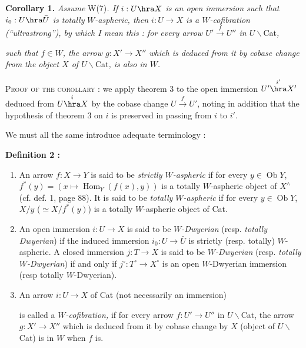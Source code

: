 \textbf{Corollary 1.} \textit{Assume} W(7)\textit{. If $i:U\hra X$ is an open immersion such that $i_0:U\hra\bar{U}$ is totally} \textit{$W$-aspheric, then $i:U\longrightarrow X$ is a $W$-cofibration (``ultrastrong''), by which I mean this : for every arrow $U'\xrightarrow{f}U''$ in $U\backslash$}Cat\textit{,}


\textit{such that $f\in W$, the arrow $g:X'\longrightarrow X''$ which is deduced from it by cobase change from the object $X$ of $U\backslash$}Cat\textit{, is also in $W$.}

\textsc{Proof of the corollary} : we apply theorem 3 to the open immersion $U'\overset{i'}{\hra}X'$ deduced from $U\overset{i}{\hra}X$ by the cobase change $U\xrightarrow{f}U'$, noting in addition that the hypothesis of theorem 3 on $i$ is preserved in passing from $i$ to $i'$.

We must all the same introduce adequate terminology :

\textbf{Definition 2 :}

\begin{enumerate}[label=\alph*)]
\item An arrow $f:X\longrightarrow Y$ is said to be \textit{strictly $W$-aspheric} if for every $y\in\operatorname{Ob}Y$, $f^*(y)=(x\longmapsto\operatorname{Hom}_Y(f(x),y))$ is a totally $W$-aspheric object of $X^\wedge$ (cf. def. 1, page 88). It is said to be \textit{totally $W$-aspheric} if for every $y\in\operatorname{Ob}Y$, $X/y$ ($\simeq X/f^*(y)$) is a totally $W$-aspheric object of Cat.

\item {}
An open immersion $i:U\longrightarrow X$ is said to be \textit{$W$-Dwyerian} (resp. \textit{totally} \textit{Dwyerian}) if the induced immersion $i_0:U\longrightarrow\bar{U}$ is strictly (resp. totally) $W$-aspheric. A closed immersion $j:T\longrightarrow X$ is said to be \textit{$W$-Dwyerian} (resp. \textit{totally $W$-Dwyerian}) if and only if $j^\circ:T^\circ\longrightarrow X^\circ$ is an open $W$-Dwyerian immersion (resp totally $W$-Dwyerian).

\item An arrow $i:U\longrightarrow X$ of Cat (not necessarily an immersion)


is called a \textit{$W$-cofibration,} if for every arrow $f:U'\longrightarrow U''$ in $U\backslash$Cat, the arrow $g:X'\longrightarrow X''$ which is deduced from it by cobase change by $X$ (object of $U\backslash$Cat) is in $W$ when $f$ is.
\end{enumerate}

